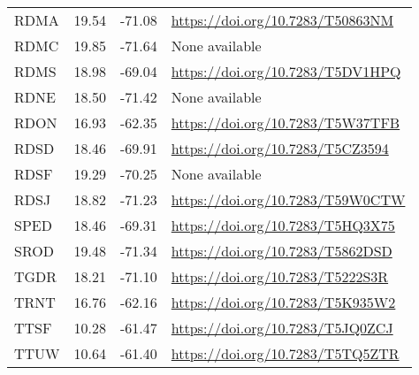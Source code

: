 \begin{landscape}
\begin{table*}
\begin{tabular}{lllp{8cm}}
    RDMA & 19.54 & -71.08 & \url{https://doi.org/10.7283/T50863NM} \\
    RDMC & 19.85 & -71.64 & None available \\
    RDMS & 18.98 & -69.04 & \url{https://doi.org/10.7283/T5DV1HPQ} \\
    RDNE & 18.50 & -71.42 & None available \\
    RDON & 16.93 & -62.35 & \url{https://doi.org/10.7283/T5W37TFB} \\
    RDSD & 18.46 & -69.91 & \url{https://doi.org/10.7283/T5CZ3594} \\
    RDSF & 19.29 & -70.25 & None available \\
    RDSJ & 18.82 & -71.23 & \url{https://doi.org/10.7283/T59W0CTW} \\
    SPED & 18.46 & -69.31 & \url{https://doi.org/10.7283/T5HQ3X75} \\
    SROD & 19.48 & -71.34 & \url{https://doi.org/10.7283/T5862DSD} \\
    TGDR & 18.21 & -71.10 & \url{https://doi.org/10.7283/T5222S3R} \\
    TRNT & 16.76 & -62.16 & \url{https://doi.org/10.7283/T5K935W2} \\
    TTSF & 10.28 & -61.47 & \url{https://doi.org/10.7283/T5JQ0ZCJ} \\
    TTUW & 10.64 & -61.40 & \url{https://doi.org/10.7283/T5TQ5ZTR} \\
    \bottomrule
\end{tabular}     
\end{table*}
  \end{landscape}
  \clearpage
  \twocolumn